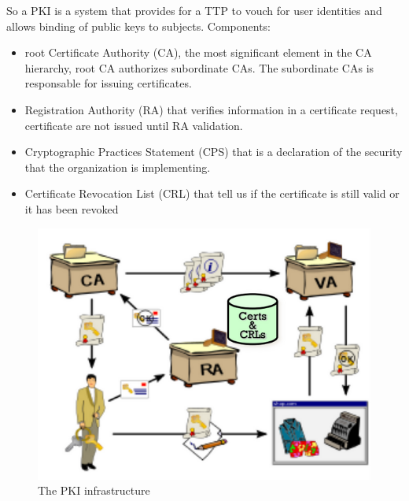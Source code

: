     So a PKI is a system that provides for a TTP to vouch for user identities and allows binding of public keys to subjects. Components:
    \begin{itemize}
        \item root Certificate Authority (CA), the most significant element in the CA hierarchy, root CA authorizes subordinate CAs. The subordinate CAs is responsable for issuing certificates.
        \item Registration Authority (RA) that verifies information in a certificate request, certificate are not issued until RA validation.
        \item Cryptographic Practices Statement (CPS) that is a declaration of the security that the organization is implementing.
        \item Certificate Revocation List (CRL) that tell us if the certificate is still valid or it has been revoked
    \end{itemize}
    
    \begin{figure}[h!]
        \centering
        \includegraphics[scale=0.3]{images/PKI.png}
        \caption{The PKI infrastructure}
        \label{fig:pki}
    \end{figure}
    
    \FloatBarrier
    
